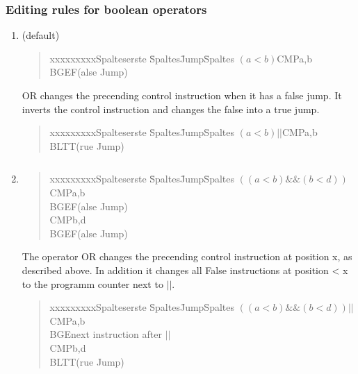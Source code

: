 \subsubsection{Editing rules for boolean operators}
\begin{enumerate}
  \item (default)
  \begin{quote}
	\begin{tabbing}
	xxxxxxxxxSpalteserste \= Spaltes\=  Jump\= Spaltes \kill
	$(a<b)$\>CMP\>a,b\\
	\>BGE\>\>F(alse Jump)\\
	\end{tabbing}
	\end{quote}
OR changes the precending control instruction when it has a false jump. It inverts the control instruction and changes the false into a true
  jump.
    \begin{quote}
	\begin{tabbing}
	xxxxxxxxxSpalteserste \= Spaltes\=  Jump\= Spaltes \kill
	$(a<b) || $\>CMP\>a,b\\
	\>BLT\>\>T(rue Jump)\\
	\end{tabbing}
	\end{quote}
\begin{verbatim}

\end{verbatim}
    \item
    
  \begin{quote}
	\begin{tabbing}
	xxxxxxxxxSpalteserste \= Spaltes\=  Jump\= Spaltes \kill
	$((a<b) \&\&  (b<d))$\>CMP\>a,b\\
	\>BGE\>\>F(alse Jump)\\
	\>CMP\>b,d\\
	\>BGE\>\>F(alse Jump)\\
	\end{tabbing}
	\end{quote}
      The operator OR changes the precending control instruction at position x, as described above. In addition it changes all False
      instructions at position < x to the programm counter next to $||$.  
  \begin{quote}
	\begin{tabbing}
	xxxxxxxxxSpalteserste \= Spaltes\=  Jump\= Spaltes \kill
	$((a<b) \&\&  (b<d))||$\>CMP\>a,b\\
	\>BGE\>\>next instruction after $||$\\
	\>CMP\>b,d\\
	\>BLT\>\>T(rue Jump)\\
	\end{tabbing}
	\end{quote}
\begin{verbatim}


\end{verbatim}
\end{enumerate}
